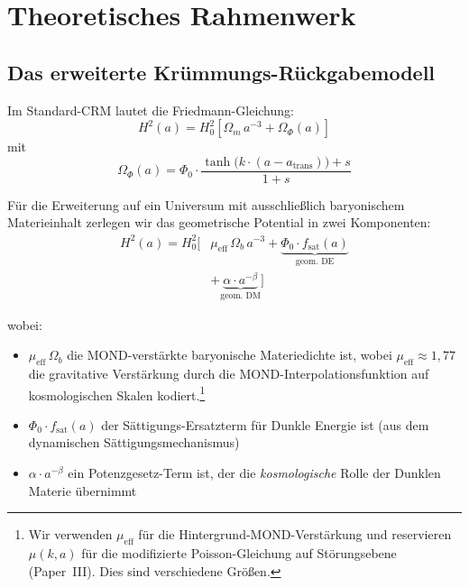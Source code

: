 \documentclass[aps,prd,twocolumn,superscriptaddress,nofootinbib]{revtex4-2}
\begin{document}
\section{Theoretisches Rahmenwerk}
\label{sec:theory}

\subsection{Das erweiterte Kr\"ummungs-R\"uckgabemodell}

Im Standard-CRM \cite{Geiger2026} lautet die Friedmann-Gleichung:
\begin{equation}
H^2(a) = H_0^2 \left[\Omega_m\,a^{-3} + \Omega_\Phi(a)\right]
\end{equation}
mit
\begin{equation}
\Omega_\Phi(a) = \Phi_0 \cdot \frac{\tanh\!\big(k\cdot(a - a_{\mathrm{trans}})\big) + s}{1 + s}
\end{equation}

F\"ur die Erweiterung auf ein Universum mit ausschließlich baryonischem Materieinhalt zerlegen wir das geometrische Potential in zwei Komponenten:
\begin{equation}
\begin{split}
H^2(a) = H_0^2 \Big[&\mu_{\mathrm{eff}}\,\Omega_b\,a^{-3} + \underbrace{\Phi_0 \cdot f_{\mathrm{sat}}(a)}_{\text{geom.\ DE}} \\
&+ \underbrace{\alpha \cdot a^{-\beta}}_{\text{geom.\ DM}}\Big]
\end{split}
\label{eq:extended_cfm}
\end{equation}

wobei:
\begin{itemize}
\item $\mu_{\mathrm{eff}}\,\Omega_b$ die MOND-verst\"arkte baryonische Materiedichte ist, wobei $\mu_{\mathrm{eff}} \approx 1{,}77$ die gravitative Verst\"arkung durch die MOND-Interpolationsfunktion auf kosmologischen Skalen kodiert.\footnote{Wir verwenden $\mu_{\mathrm{eff}}$ f\"ur die Hintergrund-MOND-Verst\"arkung und reservieren $\mu(k,a)$ f\"ur die modifizierte Poisson-Gleichung auf St\"orungsebene (Paper~III). Dies sind verschiedene Größen.}
\item $\Phi_0 \cdot f_{\mathrm{sat}}(a)$ der S\"attigungs-Ersatzterm f\"ur Dunkle Energie ist (aus dem dynamischen S\"attigungsmechanismus)
\item $\alpha \cdot a^{-\beta}$ ein Potenzgesetz-Term ist, der die \textit{kosmologische} Rolle der Dunklen Materie \"ubernimmt
\end{itemize}
\end{document}
